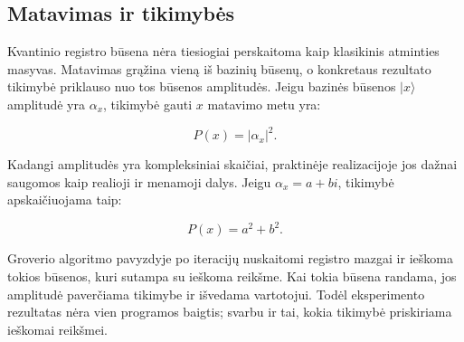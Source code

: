 \subsection{Matavimas ir tikimybės}
\label{sec:matavimas-ir-tikimybes}

Kvantinio registro būsena nėra tiesiogiai perskaitoma kaip klasikinis atminties masyvas. Matavimas grąžina vieną iš bazinių būsenų, o konkretaus rezultato tikimybė priklauso nuo tos būsenos amplitudės. Jeigu bazinės būsenos $\lvert x \rangle$ amplitudė yra $\alpha_x$, tikimybė gauti $x$ matavimo metu yra:

\begin{equation}
    P(x) = \lvert \alpha_x \rvert^2.
\end{equation}

Kadangi amplitudės yra kompleksiniai skaičiai, praktinėje realizacijoje jos dažnai saugomos kaip realioji ir menamoji dalys. Jeigu $\alpha_x = a + bi$, tikimybė apskaičiuojama taip:

\begin{equation}
    P(x) = a^2 + b^2.
\end{equation}

Groverio algoritmo pavyzdyje po iteracijų nuskaitomi registro mazgai ir ieškoma tokios būsenos, kuri sutampa su ieškoma reikšme. Kai tokia būsena randama, jos amplitudė paverčiama tikimybe ir išvedama vartotojui. Todėl eksperimento rezultatas nėra vien programos baigtis; svarbu ir tai, kokia tikimybė priskiriama ieškomai reikšmei.
